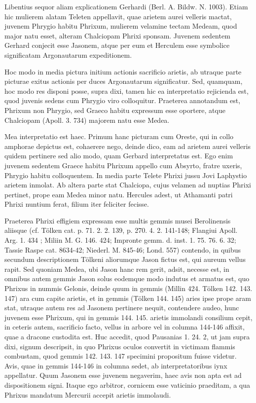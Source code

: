 \documentclass[a4paper, 11pt, oneside, polutonikogreek, german]{article}
\begin{document}
Libentius sequor aliam explicationem Gerhardi (Berl. A. Bildw. N. 1003). Etiam hic mulierem alatam Teleten appellavit, quae arietem aurei velleris mactat, juvenem Phrygio habitu Phrixum, mulierem velamine tectam Medeam, quod major natu esset, alteram Chalciopam Phrixi sponsam. Juvenem sedentem Gerhard conjecit esse Jasonem, atque per eum et Herculem esse symbolice significatam Argonautarum expeditionem.

Hoc modo in media pictura initium actionis sacrificio arietis, ab utraque parte picturae exitus actionis per duces Argonautarum significatur. Sed, quamquam, hoc modo res disponi posse, supra dixi, tamen hic ea interpretatio rejicienda est, quod juvenis sedens cum Phrygio viro colloquitur. Praeterea annotandum est, Phrixum non Phrygio, sed Graeco habitu expressum esse oportere, atque Chalciopam (Apoll. 3. 734) majorem natu esse Medea.

Mea interpretatio est haec. Primum hanc picturam cum Oreste, qui in collo amphorae depictus est, cohaerere nego, deinde dico, eam ad arietem aurei velleris quidem pertinere sed alio modo, quam Gerbard interpretatus est. Ego enim juvenem sedentem Graece habitu Phrixum appello cum Absyrto, fratre uxeris, Phrygio habitu colloquentem. In media parte Telete Phrixi jussu Jovi Laphystio arietem inmolat. Ab altera parte stat Chalciopa, cujus velamen ad nuptias Phrixi pertinet, prope eam Medea minor natu. Hercules adest, ut Athamanti patri Phrixi nuntium ferat, filium iter feliciter fecisse.

Praeterea Phrixi effigiem expressam esse multis gemmis musei Berolinensis aliisque (cf. Tölken cat. p. 71. 2. 2. 139, p. 270. 4. 2. 141-148; Flangiui Apoll. Arg. 1. 434 ; Miliin M. G. 146. 424; Impronte gemm. d. inst. 1. 75. 76. 6. 32; Tassie Raspe cat. 8634-42; Niederl. M. 845-46; Lond. 557) contendo, in quibus secundum descriptionem Tölkeni aliorumque Jason fictus est, qui aureum vellus rapit. Sed quoniam Medea, ubi Jason hanc rem gerit, adsit, necesse est, in omnibus autem gemmis Jason solus eodemque modo indutus et armatus est, quo Phrixus in nummis Gelonis, deinde quum in gemmis (Millin 424. Tölken 142. 143. 147) ara cum capite arietis, et in gemmis (Tölken 144. 145) aries ipse prope aram stat, utraque autem res ad Jasonem pertinere nequit, contendere audeo, hunc juvenem esse Phrixum, qui in gemmis 144. 145. arietis immolandi consilium cepit, in ceteris autem, sacrificio facto, vellus in arbore vel in columna 144-146 affixit, quae a dracone custodita est. Huc accedit, quod Pausanias 1. 24. 2, ut jam supra dixi, signum descripsit, in quo Phrixus oculos convertit in victimam flammis combustam, quod gemmis 142. 143. 147 specimini propositum fuisse videtur. Avis, quae in gemmis 144-146 in columna sedet, ab interpretatoribus iynx appellatur. Quum Jasonem esse juvenem negaverim, haec avis non apta est ad dispositionem signi. Itaque ego arbitror, cornicem esse vaticinio praeditam, a qua Phrixus mandatum Mercurii accepit arietis immolaudi.
\end{document}
